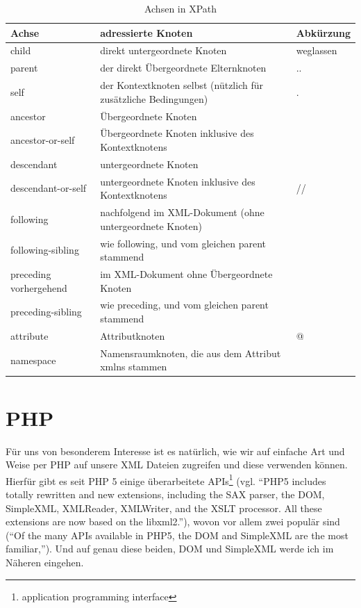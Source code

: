 {\small
  \begin{table}[hb]
    \caption{Achsen in XPath\cite{wiki:de:xpath}}
    \begin{tabularx}{\textwidth}{l|X|l}
      Achse & adressierte Knoten & Abkürzung \\
      \hline
      child & direkt untergeordnete Knoten & weglassen \\
      parent & der direkt Übergeordnete Elternknoten  & .. \\
      self & der Kontextknoten selbst (nützlich für zusätzliche Bedingungen) & . \\
      ancestor & Übergeordnete Knoten & \\
      ancestor-or-self & Übergeordnete Knoten inklusive des Kontextknotens & \\
      descendant & untergeordnete Knoten & \\
      descendant-or-self & untergeordnete Knoten inklusive des Kontextknotens & // \\
      following & nachfolgend im XML-Dokument (ohne untergeordnete Knoten) & \\
      following-sibling & wie following, und vom gleichen parent stammend & \\
      preceding vorhergehend & im XML-Dokument ohne Übergeordnete Knoten & \\
      preceding-sibling & wie preceding, und vom gleichen parent stammend & \\
      attribute & Attributknoten & @ \\
      namespace & Namensraumknoten, die aus dem Attribut xmlns stammen &
    \end{tabularx}
  \end{table}
}

\section{PHP}\label{xml-php}
Für uns von besonderem Interesse ist es natürlich, wie wir auf
einfache Art und Weise per PHP auf unsere XML Dateien zugreifen und
diese verwenden können. Hierfür gibt es seit PHP 5 einige
überarbeitete APIs\footnote{application programming interface} (vgl.
\enquote{PHP5 includes totally rewritten and new extensions, including
  the SAX parser, the DOM, SimpleXML, XMLReader, XMLWriter, and the
  XSLT processor. All these extensions are now based on the
  libxml2.}\cite{www:ibm:xml}), wovon vor allem zwei populär sind
(\enquote{Of the many APIs available in PHP5, the DOM and SimpleXML
  are the most familiar,}\cite{www:ibm:xml}). Und auf genau diese
beiden, DOM und SimpleXML werde ich im Näheren eingehen.
